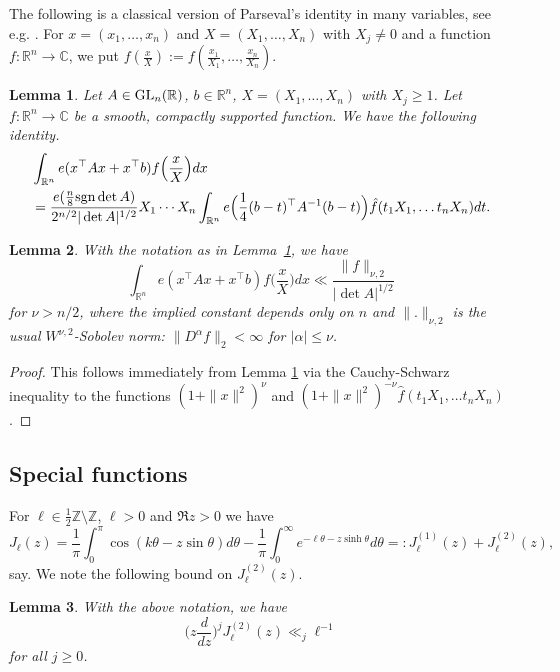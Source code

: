 \documentclass[11pt]{amsart}
\numberwithin{equation}{section}
\theoremstyle{plain}
\newtheorem{lemma}{Lemma}
\theoremstyle{definition}
\renewcommand{\geq}{\geqslant}
\renewcommand{\leq}{\le}
\numberwithin{equation}{section}
\begin{document}
The following is a classical version of Parseval's identity in many variables, see e.g. \cite[Theorem 1.15]{SW}. For $x=(x_1, \ldots, x_n)$ and $X = (X_1, \ldots, X_n)$ with $X_j \neq 0$ and a function $f \colon \mathbb{R}^n \to \mathbb{C}$, we put $f  (\frac{x}{X}  ):=  f  ( \frac{x_1}{X_1},\ldots, \frac{x_n}{X_n}  )  $.
\begin{lemma} \label{parseval}
Let $A\in {\rm GL}_n(\mathbb{R})$, $b \in \mathbb{R}^n$, $X = (X_1, \ldots, X_n)$ with $X_j \geq 1$. Let $f : \mathbb{R}^n \rightarrow \mathbb{C} $ be a smooth, compactly supported function. We have the following identity.
\begin{align} \label{parseval-eq}
&\int_{\mathbb{R}^n} e(x^{\top} A x + x^{\top} b) f\Big(\frac{x}{X}\Big) dx \\
&= \frac{e(\frac{n}{8} \text{{\rm sgn}} \det A )}{2^{n/2} |\det A|^{1/2}} X_1\cdots X_n \int_{\mathbb{R}^n} e\Big( \frac{1}{4} (b-t)^{\top} A^{-1} (b-t)\Big) \hat{f}(t_1X_1, \ldots t_nX_n) dt.
\end{align}
\end{lemma}

\begin{lemma} \label{parseval-bd}
With the notation as in Lemma~\ref{parseval}, we have
\begin{equation}\label{quadrstatph}
 \int_{\mathbb{R}^n} e(x^{\top} A x + x^{\top} b) f\Big(\frac{x}{X}\Big) dx  \ll  \frac{\| f \|_{\nu, 2}}{|\det A|^{1/2}}
\end{equation}
for $\nu> n/2$, where the implied constant depends only on  $n$ and $\| . \|_{\nu, 2}$ is the usual $W^{\nu, 2}$-Sobolev norm: $\| D^{\alpha} f \|_2 < \infty$  for $|\alpha | \leq \nu$. 

\end{lemma}

\begin{proof}
    This follows immediately from Lemma \ref{parseval} via the Cauchy-Schwarz inequality to the functions $(1+ \|x\|^2)^\nu$ and $(1+ \|x\|^2)^{-\nu} \hat{f}(t_1X_1, \ldots t_nX_n) $.
\end{proof}


\subsection{Special functions}

For $\ell \in \frac{1}{2} \mathbb{Z} \setminus \mathbb{Z}$, $\ell > 0$ and $\Re z>0$ we have \cite[8.411.13]{GR}
\begin{equation}\label{bes}
J_{\ell}(z) = \frac{1}{\pi} \int_0^{\pi} \cos(k\theta - z \sin\theta) d\theta - \frac{1}{\pi} \int_0^{\infty} e^{-\ell \theta - z\sinh\theta} d\theta =: J_{\ell}^{(1)}(z) + J_{\ell}^{(2)}(z),
\end{equation}
say.  We note the following bound on $J_{\ell}^{(2)}(z)$.
\begin{lemma}
With the above notation, we have
\begin{equation}\label{J2} 
   \Big(z \frac{d}{dz}\Big)^j J_{\ell}^{(2)}(z) \ll_j \ell^{-1}
\end{equation}
for all $j \geq 0$. 
\end{lemma}
\end{document}
